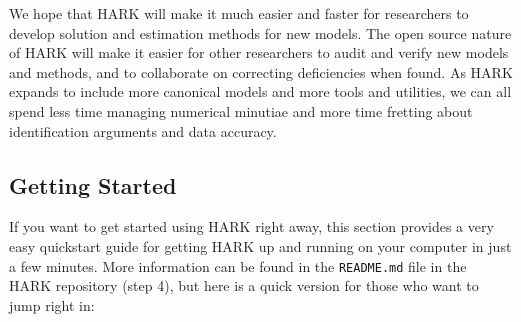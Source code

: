 \documentclass[12pt,titlepage,letterpaper]{econtex}
\begin{document}
We hope that HARK will make it much easier and faster for researchers to develop solution and estimation methods for new models.  The open source nature of HARK will make it easier for other researchers to audit and verify new models and methods, and to collaborate on correcting deficiencies when found.  As HARK expands to include more canonical models and more tools and utilities, we can all spend less time managing numerical minutiae and more time fretting about identification arguments and data accuracy.

\subsection{Getting Started}\label{sec:GettingStarted}

If you want to get started using HARK right away, this section provides a very easy quickstart guide for getting HARK up and running on your computer in just a few minutes.  More information can be found in the \texttt{README.md} file in the HARK repository (step 4), but here is a quick version for those who want to jump right in:
\end{document}
